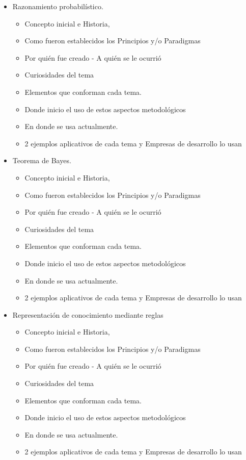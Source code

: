 \documentclass[12pt]{article}
\begin{document}
\begin{itemize}
\item Razonamiento probabilístico.
    \begin{itemize}
\item Concepto inicial e Historia,
\item Como fueron establecidos los Principios y/o Paradigmas
\item Por quién fue creado - A quién se le ocurrió
\item Curiosidades del tema
\item Elementos que conforman cada tema.
\item Donde inicio el uso de estos aspectos metodológicos
	\item En donde se usa actualmente.
\item 2 ejemplos aplicativos de cada tema y
Empresas de desarrollo lo usan
    \end{itemize}

\item Teorema de Bayes.
    \begin{itemize}
\item Concepto inicial e Historia,
\item Como fueron establecidos los Principios y/o Paradigmas
\item Por quién fue creado - A quién se le ocurrió
\item Curiosidades del tema
\item Elementos que conforman cada tema.
\item Donde inicio el uso de estos aspectos metodológicos
	\item En donde se usa actualmente.
\item 2 ejemplos aplicativos de cada tema y
Empresas de desarrollo lo usan
    \end{itemize}
    
    
    
    
    
	\item Representación de conocimiento mediante reglas
	\begin{itemize}
	   \item Concepto inicial e Historia,
	\item Como fueron establecidos los Principios y/o Paradigmas
	\item Por quién fue creado - A quién se le ocurrió
	\item Curiosidades del tema
	\item Elementos que conforman cada tema.
	\item Donde inicio el uso de estos aspectos metodológicos
	\item En donde se usa actualmente.
	\item 2 ejemplos aplicativos de cada tema y Empresas de desarrollo lo usan
	\end{itemize}
	

\end{itemize}
\end{document}
